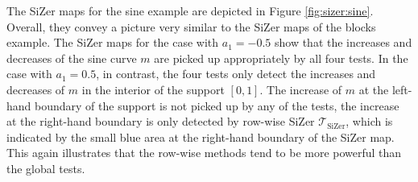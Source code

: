 The SiZer maps for the sine example are depicted in Figure \ref{fig:sizer:sine}. Overall, they convey a picture very similar to the SiZer maps of the blocks example. The SiZer maps for the case with $a_1=-0.5$ show that the increases and decreases of the sine curve $m$ are picked up appropriately by all four tests. In the case with $a_1=0.5$, in contrast, the four tests only detect the increases and decreases of $m$ in the interior of the support $[0,1]$. The increase of $m$ at the left-hand boundary of the support is not picked up by any of the tests, the increase at the right-hand boundary is only detected by row-wise SiZer $\mathcal{T}_{\text{SiZer}}$, which is indicated by the small blue area at the right-hand boundary of the SiZer map. This again illustrates that the row-wise methods tend to be more powerful than the global tests. 


